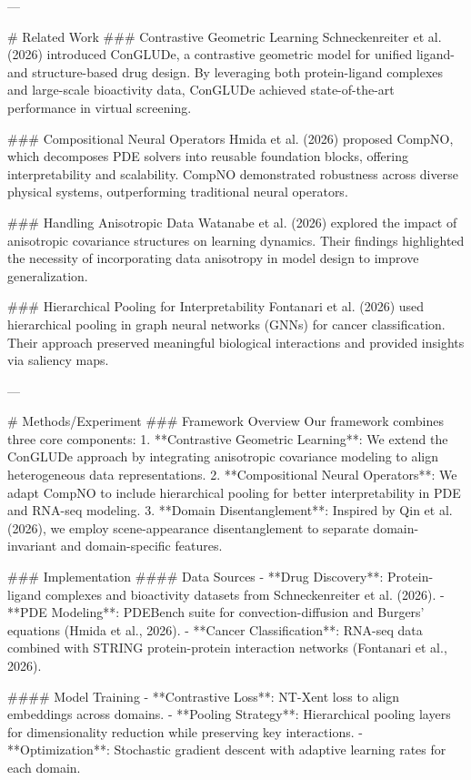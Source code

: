---

# Related Work  
### Contrastive Geometric Learning  
Schneckenreiter et al. (2026) introduced ConGLUDe, a contrastive geometric model for unified ligand- and structure-based drug design. By leveraging both protein-ligand complexes and large-scale bioactivity data, ConGLUDe achieved state-of-the-art performance in virtual screening.

### Compositional Neural Operators  
Hmida et al. (2026) proposed CompNO, which decomposes PDE solvers into reusable foundation blocks, offering interpretability and scalability. CompNO demonstrated robustness across diverse physical systems, outperforming traditional neural operators.

### Handling Anisotropic Data  
Watanabe et al. (2026) explored the impact of anisotropic covariance structures on learning dynamics. Their findings highlighted the necessity of incorporating data anisotropy in model design to improve generalization.

### Hierarchical Pooling for Interpretability  
Fontanari et al. (2026) used hierarchical pooling in graph neural networks (GNNs) for cancer classification. Their approach preserved meaningful biological interactions and provided insights via saliency maps.

---

# Methods/Experiment  
### Framework Overview  
Our framework combines three core components:  
1. **Contrastive Geometric Learning**: We extend the ConGLUDe approach by integrating anisotropic covariance modeling to align heterogeneous data representations.  
2. **Compositional Neural Operators**: We adapt CompNO to include hierarchical pooling for better interpretability in PDE and RNA-seq modeling.  
3. **Domain Disentanglement**: Inspired by Qin et al. (2026), we employ scene-appearance disentanglement to separate domain-invariant and domain-specific features.

### Implementation  
#### Data Sources  
- **Drug Discovery**: Protein-ligand complexes and bioactivity datasets from Schneckenreiter et al. (2026).  
- **PDE Modeling**: PDEBench suite for convection-diffusion and Burgers' equations (Hmida et al., 2026).  
- **Cancer Classification**: RNA-seq data combined with STRING protein-protein interaction networks (Fontanari et al., 2026).

#### Model Training  
- **Contrastive Loss**: NT-Xent loss to align embeddings across domains.  
- **Pooling Strategy**: Hierarchical pooling layers for dimensionality reduction while preserving key interactions.  
- **Optimization**: Stochastic gradient descent with adaptive learning rates for each domain.

